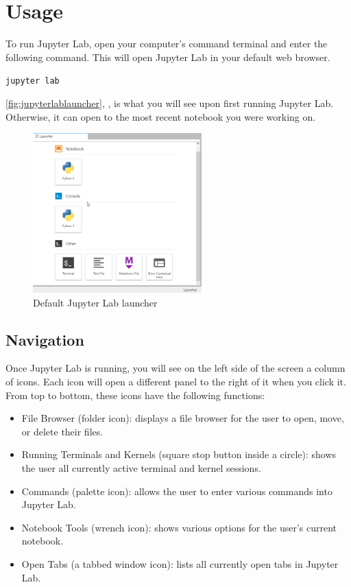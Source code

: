 \documentclass[pdftex,12pt]{artikel3}
\newcommand{\tabfigref}[1]{\autoref{#1}, \nameref{#1},}
\begin{document}
\section{Usage}

To run Jupyter Lab, open your computer's command terminal and enter the following command. This will open Jupyter Lab in your default web browser.

\texttt{jupyter lab}

\tabfigref{fig:jupyterlablauncher} is what you will see upon first running Jupyter Lab. Otherwise, it can open to the most recent notebook you were working on.

\begin{figure}[h!]
    \centering
    \includegraphics[width=65mm]{launcher.png}
    \caption{Default Jupyter Lab launcher}
    \label{fig:jupyterlablauncher}
\end{figure}

\subsection{Navigation}

Once Jupyter Lab is running, you will see on the left side of the screen a column of icons. Each icon will open a different panel to the right of it when you click it. From top to bottom, these icons have the following functions:
\begin{itemize}
    \item File Browser (folder icon): displays a file browser for the user to open, move, or delete their files.
    \item Running Terminals and Kernels (square stop button inside a circle): shows the user all currently active terminal and kernel sessions.
    \item Commands (palette icon): allows the user to enter various commands into Jupyter Lab.
    \item Notebook Tools (wrench icon): shows various options for the user's current notebook.
    \item Open Tabs (a tabbed window icon): lists all currently open tabs in Jupyter Lab.
\end{itemize}
\end{document}
